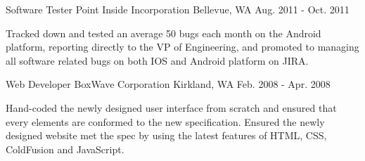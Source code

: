 \begin{cventries}

\cventry
{Software Tester} %
{Point Inside Incorporation} %
{Bellevue, WA} %
{Aug. 2011 - Oct. 2011} %
{ %
\begin{cvitems}
\item {Tracked down and tested an average 50 bugs each month on the Android platform, reporting directly to the VP of Engineering, and promoted to managing all software related bugs on both IOS and Android platform on JIRA.}
\end{cvitems}
}



\cventry
{Web Developer} %
{BoxWave Corporation} %
{Kirkland, WA} %
{Feb. 2008 - Apr. 2008} %
{ %
\begin{cvitems}
\item {Hand-coded the newly designed user interface from scratch and ensured that every elements are conformed to the new specification. Ensured the newly designed website met the spec by using the latest features of HTML, CSS, ColdFusion and JavaScript.}
\end{cvitems}
}



\end{cventries}